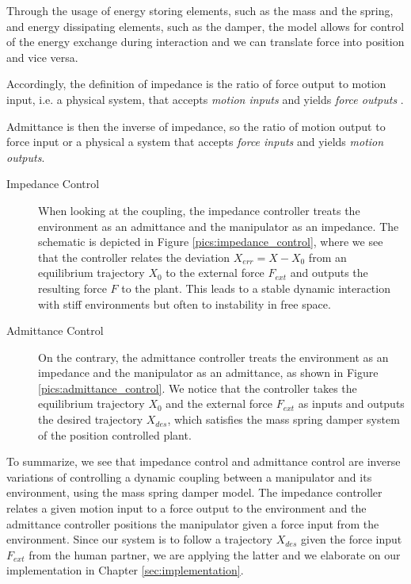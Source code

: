 Through the usage of energy storing elements, such as the mass and the spring, and energy dissipating elements, such as the damper, the model allows for control of the energy exchange during interaction and we can translate force into position and vice versa. 

Accordingly, the definition of impedance is the ratio of force output to motion input, i.e. a physical system, that accepts \emph{motion inputs} and yields \emph{force outputs} \citep{ott2010unified}.

Admittance is then the inverse of impedance, so the ratio of motion output to force input or a physical a system that accepts \emph{force inputs} and yields \emph{motion outputs}.

\begin{description}
\item[Impedance Control] When looking at the coupling, the impedance controller treats the environment as an admittance and the manipulator as an impedance. The schematic is depicted in Figure \ref{pics:impedance_control}, where we see that the controller relates the deviation $X_{err} = X - X_0$ from an equilibrium trajectory $X_0$ to the external force $F_{ext}$ and outputs the resulting force $F$ to the plant. This leads to a stable dynamic interaction with stiff environments but often to instability in free space.

\item[Admittance Control] On the contrary, the admittance controller treats the environment as an impedance and the manipulator as an admittance, as shown in Figure \ref{pics:admittance_control}. We notice that the controller takes the equilibrium trajectory $X_0$ and the external force $F_{ext}$ as inputs and outputs the desired trajectory $X_{des}$, which satisfies the mass spring damper system of the position controlled plant.
\end{description}

To summarize, we see that impedance control and admittance control are inverse variations of controlling a dynamic coupling between a manipulator and its environment, using the mass spring damper model. The impedance controller relates a given motion input to a force output to the environment and the admittance controller positions the manipulator given a force input from the environment. Since our system is to follow a trajectory $X_{des}$ given the force input $F_{ext}$ from the human partner, we are applying the latter and we elaborate on our implementation in Chapter \ref{sec:implementation}.

